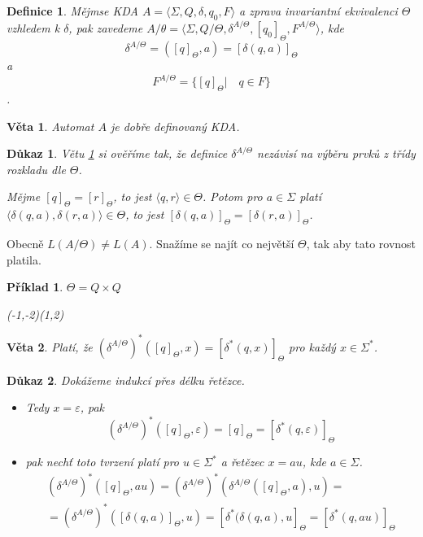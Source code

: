 \documentclass[10pt, a4paper, titlepage]{article}
\theoremstyle{note}
\newtheorem{veta}{Věta}
\newtheorem{definice}{Definice}
\newtheorem{dukaz}{Důkaz}
\newtheorem{priklad}{Příklad}
\begin{document}
\begin{definice}
Mějmse KDA $A = \langle \Sigma, Q, \delta, q_{0}, F \rangle$ a zprava invariantní ekvivalenci $\Theta$ vzhledem k
$\delta$, pak zavedeme $A/\theta = \langle \Sigma, Q/\Theta, \delta^{A/\Theta}, [q_{0}]_{\Theta}, F^{A/\Theta} \rangle$, kde
$$\delta^{A/\Theta} = ([q]_{\Theta}, a) = [\delta(q, a)]_{\Theta}$$
a
$$F^{A/\Theta} = \lbrace [q]_{\Theta} | \quad q \in F \rbrace$$.
\end{definice}

\begin{veta}\label{veta-aut}
Automat $A$ je dobře definovaný KDA.
\end{veta}

\begin{dukaz}
Větu \ref{veta-aut} si ověříme tak, že definice $\delta^{A/\Theta}$ nezávisí na výběru prvků z třídy rozkladu
dle $\Theta$.

Mějme $[q]_\Theta = [r]_\Theta$,  to jest $\langle q,r \rangle \in \Theta$. Potom pro $a \in \Sigma$ platí $\langle \delta(q,a), \delta(r,a) \rangle \in \Theta$, to jest $[ \delta(q,a)]_\Theta = [ \delta(r,a)]_\Theta$.
\end{dukaz}

Obecně $L(A/\Theta) \neq L(A)$. Snažíme se najít co největší $\Theta$, tak aby tato rovnost platila.

\begin{priklad}
$\Theta = Q \times Q$
\begin{center}
\begin{VCPicture}{(-1,-2)(1,2)}
\end{VCPicture}
\end{center}

\end{priklad}

\begin{veta}\label{veta-x2}
Platí, že $(\delta^{A/\Theta})^*([q]_\Theta,x)=[\delta^*(q,x)]_\Theta$ pro každý $x \in \Sigma^*$.
\end{veta}

\begin{dukaz}
Dokážeme indukcí přes délku řetězce.
\begin{itemize}
\item
Tedy $x = \varepsilon$, pak
$$(\delta^{A/ \Theta})^{*}([q]_\Theta,\varepsilon)=[q]_\Theta=[\delta^{*}(q,\varepsilon)]_\Theta$$

\item
pak nechť toto tvrzení platí pro $u \in \Sigma^{*}$ a řetězec $x = au$, kde $a \in \Sigma$.
\begin{gather*}
(\delta^{A/ \Theta})^{*}([q]_{\Theta}, au) = (\delta^{A/ \Theta})^{*}(\delta^{A/ \Theta} ([q]_{\Theta}, a), u ) = \\
= (\delta^{A/ \Theta})^{*} ([\delta(q, a)]_{\Theta}, u) = [\delta^{*} (\delta(q, a), u]_{\Theta} = [\delta^{*} (q, au)]_{\Theta}
\end{gather*}
\end{itemize}
\end{dukaz}
\end{document}
